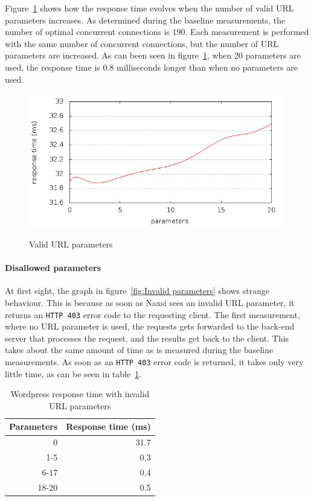 \documentclass[Experiments]{subfiles}
\begin{document}
Figure~\ref{fig:wordpress_with_naxsi_valid_parameters} shows how the response time evolves when the number of valid \ac{URL} parameters increases. As determined during the baseline measurements, the number of optimal concurrent connections is $190$. Each measurement is performed with the same number of concurrent connections, but the number of \ac{URL} parameters are increased. As can been seen in figure~\ref{fig:wordpress_with_naxsi_valid_parameters}, when 20 parameters are used, the response time is $0.8$ milliseconds longer than when no parameters are used.

\begin{figure}[H]
\caption{Valid URL parameters}
\centering
\includegraphics[scale=0.55] {images/results/wp_with_naxsi_incremented_allowed_parameters/output.png}
\label{fig:wordpress_with_naxsi_valid_parameters}
\end{figure}

\paragraph{Disallowed parameters}

At first sight, the graph in figure~\ref{fig:Invalid parameters} shows strange behaviour. This is because as soon as Naxsi sees an invalid \ac{URL} parameter, it returns an \verb+HTTP 403+ error code to the requesting client. The first measurement, where no \ac{URL} parameter is used, the requests gets forwarded to the back-end server that processes the request, and the results get back to the client. This takes about the same amount of time as is measured during the baseline measurements. As soon as an \verb+HTTP 403+ error code is returned, it takes only very little time, as can be seen in table~\ref{tab:Wordpress response time with invalid URL parameters}.

\begin{table}[H]
\caption{Wordpress response time with invalid URL parameters}
\center
\begin{tabular}{|r|r|}
\hline
\textbf{Parameters} & \textbf{Response time (ms)}\\ \hline
0 & 31.7 \\ \hline
1-5 & 0.3 \\ \hline
6-17 & 0.4 \\ \hline
18-20 & 0.5 \\ \hline
\end{tabular}
\label{tab:Wordpress response time with invalid URL parameters}
\end{table}
\end{document}
